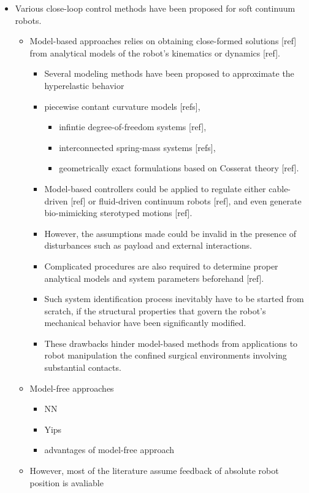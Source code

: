 \documentclass[journal,onecolumn]{IEEEtran}
\begin{document}
\begin{itemize}
\item Various close-loop control methods have been proposed for soft continuum robots.
\begin{itemize}
\item Model-based approaches relies on obtaining close-formed solutions [ref] from analytical models of the robot's kinematics or dynamics [ref].
\begin{itemize}
\item Several modeling methods have been proposed to approximate the hyperelastic behavior
\item piecewise contant curvature models [refs],
\begin{itemize}
\item infintie degree-of-freedom systems [ref],
\item interconnected spring-mass systems [refs],
\item geometrically exact formulations based on Cosserat theory [ref].
\end{itemize}
\item Model-based controllers could be applied to regulate either cable-driven [ref] or fluid-driven continuum robots [ref], and even generate bio-mimicking sterotyped motions [ref].
\item However, the assumptions made could be invalid in the presence of disturbances such as payload and external interactions.
\item Complicated procedures are also required to determine proper analytical models and system parameters beforehand [ref].
\item Such system identification process inevitably have to be started from scratch, if the structural properties that govern the robot's mechanical behavior have been significantly modified.
\item These drawbacks hinder model-based methods from applications to robot manipulation the confined surgical environments involving substantial contacts.
\end{itemize}
\item Model-free approaches
\begin{itemize}
\item NN
\item Yips
\item advantages of model-free approach
\end{itemize}
\item However, most of the literature assume feedback of absolute robot position is avaliable
\end{itemize}


\end{itemize}
\end{document}
